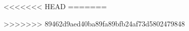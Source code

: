 \newcommand{\todonote}[1]{\textcolor{red}{#1}}
\newcommand{\attention}[1]{\textcolor{green}{#1}}
\newcommand{\HRule}{\rule{\linewidth}{0.5mm}}
\newcommand{\cellBox}[1]{\pbox{0.6\textwidth}{#1}}

\newcommand*\rot{\rotatebox{90}}
\newcommand*\OK{\ding{51}}

\newcommand{\tw}[1]{#1\textwidth}

<<<<<<< HEAD
=======
\newcommand{\ignore}[1]{}

>>>>>>> 89462d9aed40ba89fa89bfb24af73d5802479848
\makeatletter

\newcommand{\manuallabel}[2]{\def\@currentlabel{#2}\label{#1}}

\newcommand{\getNext}[1]{%
  \@ifundefined{c@#1}
    {%
     \newcounter{#1}\setcounter{#1}{1}%
    }
    {%
     \stepcounter{#1}%
    }%
}

\newcommand{\getNr}[1]{%
	\getNext{1}
	\arabic{#1}
}

\newcommand{\nextNrRef}[1]{%
	\getNext{#1}
	\manuallabel{#1:\arabic{#1}}{\arabic{#1}}
	\arabic{#1}
}

\newcommand{\nextNrRefl}[2]{%
	\nextNrRef{#1}
	\manuallabel{#1:#2}{\arabic{#1}}
}

\newcommand{\req}[1]{%
	\uppercase{#1}-\nextNrRef{#1}
}

\newcommand{\reql}[2]{%
	\req{#1}
	\manuallabel{#1:#2}{\arabic{#1}}
}

\newcommand{\frReqRow}[3]{%
	\midrule
	\phantomsection
	\manuallabel{fr:#1}{#1} 	
	FR-#1 &
	\ifcase\pdfstrcmp{#2}{Must}%
	   \textbf{#2}
	\else
	  #2
	\fi
	 &
	#3
	\\
}

\newcommand{\reqRow}[4]{%
	\midrule
	\phantomsection
	\manuallabel{#1:#2}{#2} 	
	\uppercase{#1}-#2 &
	\ifcase\pdfstrcmp{#3}{Must}%
	   \textbf{#3}
	\else
	  #3
	\fi
	 &
	#4
	\\
}

\makeatother





